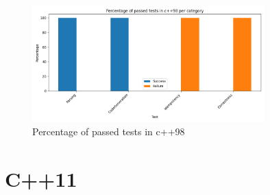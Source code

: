 \documentclass{article}
\begin{document}
\newpage
\begin{figure}[h!]
\centering
\includegraphics[width=0.8\textwidth]{../reports/artisan/images/c++98_percentage.png}
\caption{Percentage of passed tests in c++98}
\label{fig:c++98_percentage}
\end{figure}
\newpage
\section{C++11}
\end{document}
